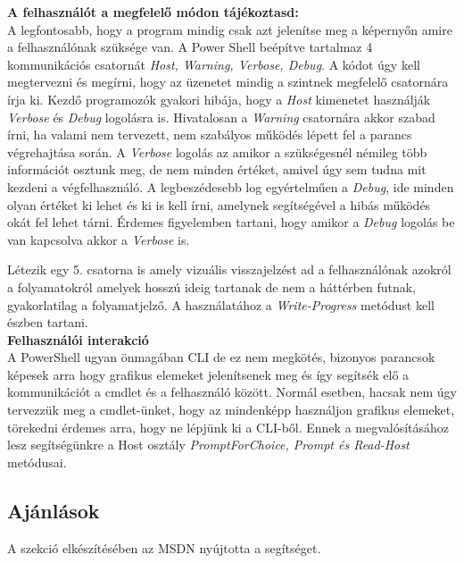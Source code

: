 \documentclass[12pt,oneside,justify,table]{book}
\renewcommand{\listfigurename}{Ábrajegyzék} %
\begin{document}
\noindent \textbf{A felhasználót a megfelelő módon tájékoztasd:} \\
A legfontosabb, hogy a program mindig csak azt jelenítse meg a képernyőn amire a felhasználónak szüksége van. A Power Shell beépítve tartalmaz 4 kommunikációs csatornát \textit{Host, Warning, Verbose, Debug}. A kódot úgy kell megtervezni és megírni, hogy az üzenetet mindig a szintnek megfelelő csatornára írja ki. Kezdő programozók gyakori hibája, hogy a \textit{Host} kimenetet használják  \textit{Verbose} és \textit{Debug} logolásra is.  Hivatalosan a \textit{Warning} csatornára akkor szabad írni, ha valami nem tervezett, nem szabályos működés lépett fel a parancs végrehajtása során. A \textit{Verbose} logolás az amikor a szükségesnél némileg több információt osztunk meg, de nem minden értéket, amivel úgy sem tudna mit kezdeni a végfelhasználó. A legbeszédesebb log egyértelműen a \textit{Debug}, ide minden olyan értéket ki lehet és ki is kell írni, amelynek segítségével a hibás működés okát fel lehet tárni. Érdemes figyelemben tartani, hogy amikor a \textit{Debug} logolás be van kapcsolva akkor a \textit{Verbose} is. 

Létezik egy 5. csatorna is amely vizuális visszajelzést ad a felhasználónak azokról a folyamatokról amelyek hosszú ideig tartanak de nem a háttérben futnak, gyakorlatilag a folyamatjelző. A használatához a \textit{Write-Progress} metódust kell észben tartani.\\

\noindent \textbf{Felhasználói interakció}\\
A PowerShell ugyan önmagában CLI de ez nem megkötés, bizonyos parancsok képesek arra hogy grafikus elemeket jelenítsenek meg és így segítsék elő a kommunikációt a cmdlet és a felhasználó között. Normál esetben, hacsak nem úgy tervezzük meg a cmdlet-ünket, hogy az mindenképp használjon grafikus elemeket, törekedni érdemes arra, hogy ne lépjünk ki a CLI-ből. Ennek a megvalósításához lesz segítségünkre a Host osztály \textit{PromptForChoice, Prompt és Read-Host} metódusai.

\subsection{Ajánlások}

A szekció elkészítésében az MSDN nyújtotta a segítséget. \cite{PowerShellGuidelines}

\addcontentsline{toc}{chapter}{\listfigurename}
\listoffigures
\printbibliography[heading=bibintoc,title={Irodalomjegyzék}]
\end{document}
